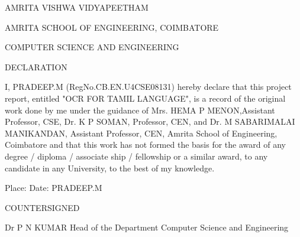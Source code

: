 

AMRITA VISHWA VIDYAPEETHAM

AMRITA SCHOOL OF ENGINEERING,
COIMBATORE

COMPUTER SCIENCE AND ENGINEERING      


DECLARATION

I, PRADEEP.M (RegNo.CB.EN.U4CSE08131) hereby declare that this project report, entitled "OCR FOR TAMIL LANGUAGE", is a record of the original work done by me under the guidance of Mrs. HEMA P MENON,Assistant Professor, CSE,  Dr. K P SOMAN, Professor, CEN, and Dr. M SABARIMALAI MANIKANDAN, Assistant Professor, CEN, Amrita School of Engineering, Coimbatore and that this work has not formed the basis for the award of any degree / diploma / associate ship / fellowship or a similar award, to any candidate in any University, to the best of my knowledge.



Place:
Date:                                                                                                                  PRADEEP.M


COUNTERSIGNED


Dr P N KUMAR
Head of the Department
Computer Science and Engineering